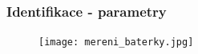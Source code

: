 \documentclass{beamer}
\begin{document}
    \begin{frame}
        
        
        \frametitle{Identifikace - parametry}
        
        \begin{figure}[htbp]
            \centerline{\texttt{[image: mereni\_baterky.jpg]}}
            \label{fig:mereni_baterky}        
        \end{figure}
    \end{frame}
    
\end{document}
